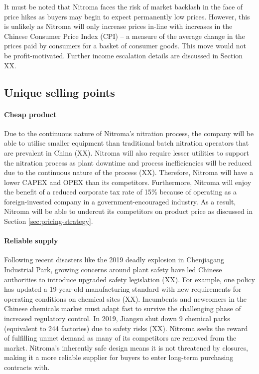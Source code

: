 It must be noted that Nitroma faces the risk of market backlash in the face of price hikes as buyers may begin to expect permanently low prices. However, this is unlikely as Nitroma will only increase prices in-line with increases in the Chinese Consumer Price Index (CPI) – a measure of the average change in the prices paid by consumers for a basket of consumer goods. This move would not be profit-motivated. Further income escalation details are discussed in Section XX.

\subsection{Unique selling points}
\label{sec:USP}
\paragraph{Cheap product}
Due to the continuous nature of Nitroma’s nitration process, the company will be able to utilise smaller equipment than traditional batch nitration operators that are prevalent in China (XX). Nitroma will also require lesser utilities to support the nitration process as plant downtime and process inefficiencies will be reduced due to the continuous nature of the process (XX). Therefore, Nitroma will have a lower CAPEX and OPEX than its competitors. Furthermore, Nitroma will enjoy the benefit of a reduced corporate tax rate of 15\% because of operating as a foreign-invested company in a government-encouraged industry. As a result, Nitroma will be able to undercut its competitors on product price as discussed in Section \ref{sec:pricing-strategy}.

\paragraph{Reliable supply}
Following recent disasters like the 2019 deadly explosion in Chenjiagang Industrial Park, growing concerns around plant safety have led Chinese authorities to introduce upgraded safety legislation (XX). For example, one policy has updated a 19-year-old manufacturing standard with new requirements for operating conditions on chemical sites (XX). Incumbents and newcomers in the Chinese chemicals market must adapt fast to survive the challenging phase of increased regulatory control. In 2019, Jiangsu shut down 9 chemical parks (equivalent to 244 factories) due to safety risks (XX). Nitroma seeks the reward of fulfilling unmet demand as many of its competitors are removed from the market. Nitroma’s inherently safe design means it is not threatened by closures, making it a more reliable supplier for buyers to enter long-term purchasing contracts with.


